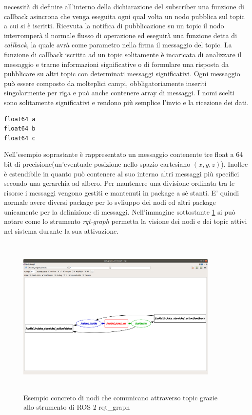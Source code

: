 \documentclass[a4paper,11 pt,oneside]{book}
\theoremstyle{definition}
\begin{document}
necessità di definire all’interno della dichiarazione del subscriber una funzione
di callback asincrona che venga eseguita ogni qual volta un nodo pubblica sul
topic a cui si è iscritti. Ricevuta la notifica di pubblicazione su un topic il nodo interromperà il normale flusso di operazione ed eseguirà una funzione detta di \emph{callback}, la quale avrà come parametro nella firma il messaggio del topic. La funzione di callback iscritta ad un topic solitamente è incaricata di analizzare il messaggio e trarne informazioni significative o  di formulare una risposta da pubblicare su altri topic con determinati messaggi significativi.
Ogni messaggio può essere composto da molteplici campi, obbligatoriamente inseriti singolarmente per riga e può anche contenere array di messaggi. 
I nomi scelti sono solitamente significativi e rendono più semplice l'invio e la ricezione dei dati.
\begin{lstlisting}
float64 a
float64 b
float64 c
\end{lstlisting}

Nell'esempio soprastante è rappresentato un messaggio contenente tre float a 64 bit di precisione(un'eventuale posizione nello spazio cartesiano $(x,y,z)$).
Inoltre è estendibile in quanto può contenere al suo interno altri messaggi più specifici secondo una gerarchia ad albero.
Per mantenere una divisione ordinata tra le risorse i messaggi vengono gestiti e mantenuti in package a sè stanti. E' quindi normale avere diversi package per lo svliuppo dei nodi ed altri package unicamente per la definizione di messaggi. Nell'immagine sottostante \ref{rqt-g} si può notare come lo strumento \emph{rqt-graph} permetta la visione dei nodi e dei topic attivi nel sistema durante la sua attivazione.
\\
\begin{figure}[!htbp]
\centering
\includegraphics[width=10cm, height=8cm]{rqt-graph.png}
\caption{Esempio concreto di nodi che comunicano attraverso topic grazie allo strumento di ROS 2 rqt_graph}
\label{rqt-g}
\end{figure}
\end{document}
